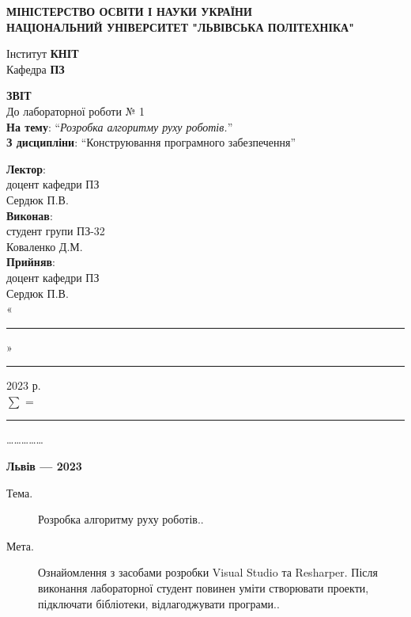 \documentclass[14pt]{extreport}
\newcommand\subject{Конструювання програмного забезпечення}
\newcommand\lecturer{доцент кафедри ПЗ\\Сердюк П.В.}
\newcommand\teacher{доцент кафедри ПЗ\\Сердюк П.В.}
\newcommand\mygroup{ПЗ-32}
\newcommand\lab{1}
\newcommand\theme{Розробка алгоритму руху роботів.}
\newcommand\purpose{Ознайомлення з засобами розробки Visual Studio та Resharper. Після
	виконання лабораторної студент повинен уміти створювати проекти, підключати бібліотеки,
	відлагоджувати програми.}
\begin{document}
\begin{normalsize}
	\begin{titlepage}
		\thispagestyle{empty}
		\begin{center}
			\textbf{МІНІСТЕРСТВО ОСВІТИ І НАУКИ УКРАЇНИ\\
				НАЦІОНАЛЬНИЙ УНІВЕРСИТЕТ "ЛЬВІВСЬКА ПОЛІТЕХНІКА"}
		\end{center}
		\begin{flushright}
			Інститут \textbf{КНІТ}\\
			Кафедра \textbf{ПЗ}
		\end{flushright}
		\vspace{200pt}
		\begin{center}
			\textbf{ЗВІТ}\\
			\vspace{10pt}
			До лабораторної роботи № \lab\\
			\textbf{На тему}: “\textit{\theme}”\\
			\textbf{З дисципліни}: “\subject”
		\end{center}
		\vspace{40pt}
		\begin{flushright}
			
			\textbf{Лектор}:\\
			\lecturer\\
			\vspace{10pt}
			\textbf{Виконав}:\\
			
			студент групи \mygroup\\
			Коваленко Д.М.\\
			\vspace{10pt}
			\textbf{Прийняв}:\\
			
			\teacher\\
			
			\vspace{28pt}
			«\rule{1cm}{0.15mm}» \rule{1.5cm}{0.15mm} 2023 р.\\
			$\sum$ = \rule{1cm}{0.15mm}……………\\
			
		\end{flushright}
		\vspace{\fill}
		\begin{center}
			\textbf{Львів — 2023}
		\end{center}
	\end{titlepage}
		
	\begin{description}
		\item[Тема.] \theme.
		\item[Мета.] \purpose.
	\end{description}


\end{normalsize}
\end{document}
